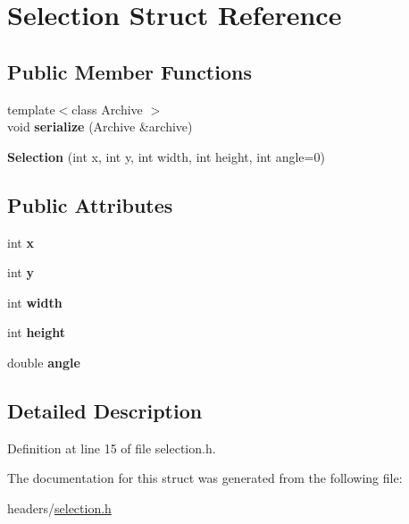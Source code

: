 \hypertarget{structSelection}{}\section{Selection Struct Reference}
\label{structSelection}
\subsection*{Public Member Functions}
\begin{DoxyCompactItemize}
\item 
\hypertarget{structSelection_adbb242e3a61e04da7460170dfbc2bae6}{}{\footnotesize template$<$class Archive $>$ }\\void {\bfseries serialize} (Archive \&archive)\label{structSelection_adbb242e3a61e04da7460170dfbc2bae6}

\item 
\hypertarget{structSelection_a7869a17657fdee2ddc601446776560c8}{}{\bfseries Selection} (int x, int y, int width, int height, int angle=0)\label{structSelection_a7869a17657fdee2ddc601446776560c8}

\end{DoxyCompactItemize}
\subsection*{Public Attributes}
\begin{DoxyCompactItemize}
\item 
\hypertarget{structSelection_aea07aa2d6e4ad8913e601a6be8fea52c}{}int {\bfseries x}\label{structSelection_aea07aa2d6e4ad8913e601a6be8fea52c}

\item 
\hypertarget{structSelection_ae95986151d57c8c4b06dadfe967b2a74}{}int {\bfseries y}\label{structSelection_ae95986151d57c8c4b06dadfe967b2a74}

\item 
\hypertarget{structSelection_ae11882f5ebb0a0ed08bfc903b174d253}{}int {\bfseries width}\label{structSelection_ae11882f5ebb0a0ed08bfc903b174d253}

\item 
\hypertarget{structSelection_a889204908783a2e132df34c001e4d40a}{}int {\bfseries height}\label{structSelection_a889204908783a2e132df34c001e4d40a}

\item 
\hypertarget{structSelection_a00964248804d5766816c6fed9ce67920}{}double {\bfseries angle}\label{structSelection_a00964248804d5766816c6fed9ce67920}

\end{DoxyCompactItemize}


\subsection{Detailed Description}


Definition at line 15 of file selection.\+h.



The documentation for this struct was generated from the following file\+:\begin{DoxyCompactItemize}
\item 
headers/\hyperlink{selection_8h}{selection.\+h}\end{DoxyCompactItemize}
